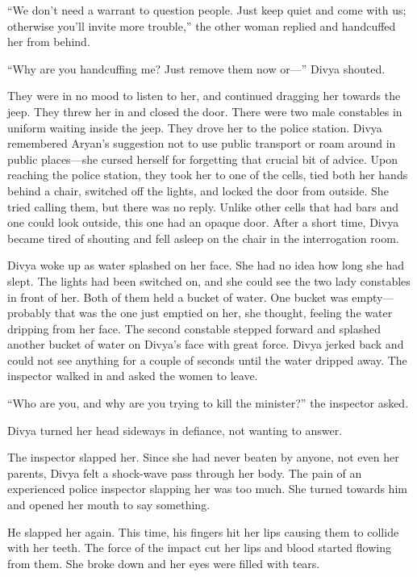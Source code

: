 “We don't need a warrant to question people. Just keep quiet and come with us;
otherwise you'll invite more trouble,” the other woman replied and handcuffed
her from behind.

“Why are you handcuffing me? Just remove them now or—” Divya shouted.

They were in no mood to listen to her, and continued dragging her towards the
jeep. They threw her in and closed the door. There were two male constables in
uniform waiting inside the jeep. They drove her to the police station. Divya
remembered Aryan's suggestion not to use public transport or roam around in
public places—she cursed herself for forgetting that crucial bit of advice. Upon
reaching the police station, they took her to one of the cells, tied both her
hands behind a chair, switched off the lights, and locked the door from outside.
She tried calling them, but there was no reply. Unlike other cells that had bars
and one could look outside, this one had an opaque door. After a short time,
Divya became tired of shouting and fell asleep on the chair in the interrogation
room.

Divya woke up as water splashed on her face. She had no idea how long she had
slept. The lights had been switched on, and she could see the two lady
constables in front of her. Both of them held a bucket of water. One bucket
was empty—probably that was the one just emptied on her, she thought, feeling
the water dripping from her face. The second constable stepped forward and
splashed another bucket of water on Divya's face with great force. Divya jerked
back and could not see anything for a couple of seconds until the water dripped
away. The inspector walked in and asked the women to leave.

“Who are you, and why are you trying to kill the minister?” the inspector asked.

Divya turned her head sideways in defiance, not wanting to answer.

The inspector slapped her. Since she had never beaten by anyone, not even her
parents, Divya felt a shock-wave pass through her body. The pain of an
experienced police inspector slapping her was too much. She turned towards him
and opened her mouth to say something.

He slapped her again. This time, his fingers hit her lips causing them to
collide with her teeth. The force of the impact cut her lips and blood started
flowing from them.  She broke down and her eyes were filled with tears.

